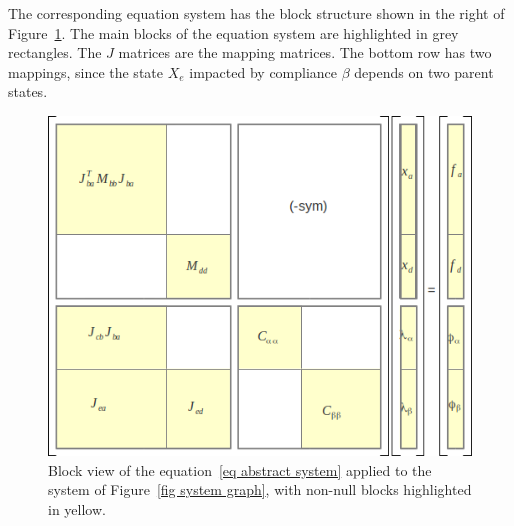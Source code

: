 The corresponding equation system has the block structure shown in the right of Figure~\ref{fig system matrix}.
The main blocks of the equation system are highlighted in grey rectangles. The $J$ matrices are the mapping matrices. The bottom row has two mappings, since the state $X_e$ impacted by compliance $\beta$ depends on two parent states.
\begin{figure}
\centering
 \includegraphics[width=0.7\linewidth]{system-bigmatrix.png}
\caption{Block view of the equation~\ref{eq abstract system} applied to the system of Figure~\ref{fig system graph}, with non-null blocks highlighted in yellow.}
\label{fig system matrix}
\end{figure}


